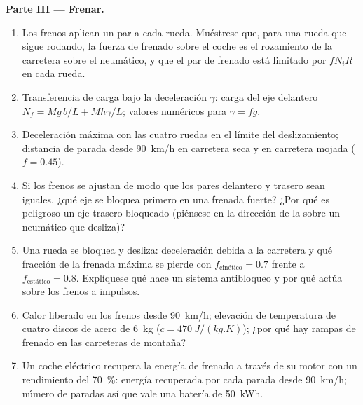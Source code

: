 \begin{problem}
\medskip
\noindent\textbf{Parte III --- Frenar.}
\begin{enumerate}[resume]
  \item Los frenos aplican un par a cada rueda. Muéstrese que, para una
        rueda que sigue rodando, la fuerza de frenado sobre el coche es el
        rozamiento de la carretera sobre el neumático, y que el par de
        frenado está limitado por $fN_iR$ en cada rueda.
  \item Transferencia de carga bajo la deceleración $\gamma$: carga del
        eje delantero $N_f = Mg\,b/L + Mh\gamma/L$; valores numéricos para
        $\gamma = fg$.
  \item Deceleración máxima con las cuatro ruedas en el límite del
        deslizamiento; distancia de parada desde \qty{90}{km/h} en
        carretera seca y en carretera mojada ($f = 0.45$).
  \item Si los frenos se ajustan de modo que los pares delantero y trasero
        sean iguales, ¿qué eje se bloquea primero en una frenada fuerte?
        ¿Por qué es peligroso un eje trasero bloqueado (piénsese en la
        dirección de la  sobre un neumático que
        desliza)?
  \item Una rueda se bloquea y desliza: deceleración debida a la carretera
        y qué fracción de la frenada máxima se pierde con
        $f_{\text{cinético}} =
        0.7$ frente a $f_{\text{estático}} = 0.8$.
        Explíquese qué hace un sistema antibloqueo y por qué actúa sobre
        los frenos a impulsos.
  \item Calor liberado en los frenos desde \qty{90}{km/h}; elevación de
        temperatura de cuatro discos de acero de \qty{6}{kg}
        ($c = \qty{470}{J/(kg.K)}$); ¿por qué hay rampas de frenado en las
        carreteras de montaña?
  \item Un coche eléctrico recupera la energía de frenado a través de su
        motor con un rendimiento del \qty{70}{\%}: energía recuperada por
        cada parada desde \qty{90}{km/h}; número de paradas así que vale
        una batería de \qty{50}{kWh}.
\end{enumerate}


\end{problem}
